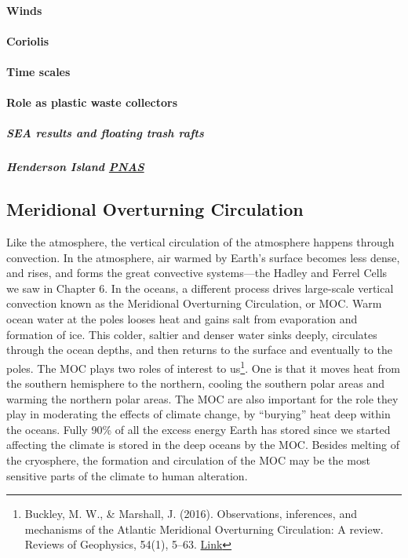 \documentclass[amstex,12pt]{book}
\begin{document}
{\paragraph{Winds}
\paragraph{Coriolis}
\paragraph{Time scales}
\paragraph{Role as plastic waste collectors}
\subparagraph{SEA results and floating trash rafts}
\subparagraph{Henderson Island \href{http://www.pnas.org/content/114/23/6052.short?ssource=mfr&rss=1}{PNAS}}


\subsection{Meridional Overturning Circulation}\label{MOCs}
Like the atmosphere, the vertical circulation of the atmosphere happens through convection. In the atmosphere, air warmed by Earth's surface becomes less dense, and rises, and forms the great convective systems---the Hadley and Ferrel  Cells we saw in Chapter 6. In the oceans, a different process drives large-scale vertical convection known as the Meridional Overturning Circulation, or MOC. Warm ocean water at the poles looses heat and gains salt from evaporation and formation of ice. This colder, saltier and denser water sinks deeply, circulates through the ocean depths, and then returns to the surface and eventually to the poles. The MOC plays two roles of interest to us\footnote{Buckley, M. W., \& Marshall, J. (2016). Observations, inferences, and mechanisms of the Atlantic Meridional Overturning Circulation: A review. Reviews of Geophysics, 54(1), 5–63. \href{https://doi.org/10.1002/2015RG000493}{Link}
}. One is that it moves heat from the southern hemisphere to the northern, cooling the southern polar areas and warming the northern polar areas. The MOC are also important for the role they play in moderating the effects of climate change, by ``burying'' heat deep within the oceans. Fully 90\% of all the excess energy Earth has stored since we started affecting the climate is stored in the deep oceans by the MOC. Besides melting of the cryosphere, the formation and circulation of the MOC may be the most sensitive parts of the climate to human alteration.    
}
\end{document}
